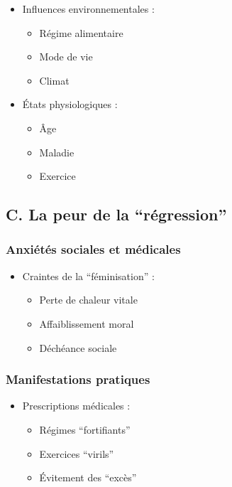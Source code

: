 \documentclass[
  letterpaper,
  DIV=11,
  numbers=noendperiod]{scrreprt}
\providecommand{\tightlist}{%
  \setlength{\itemsep}{0pt}\setlength{\parskip}{0pt}}\usepackage{longtable,booktabs,array}
\begin{document}
\begin{itemize}
\tightlist
\item
  Influences environnementales :

  \begin{itemize}
  \tightlist
  \item
    Régime alimentaire
  \item
    Mode de vie
  \item
    Climat
  \end{itemize}
\item
  États physiologiques :

  \begin{itemize}
  \tightlist
  \item
    Âge
  \item
    Maladie
  \item
    Exercice
  \end{itemize}
\end{itemize}

\subsection{C. La peur de la
``régression''}\label{c.-la-peur-de-la-ruxe9gression}

\subsubsection{Anxiétés sociales et
médicales}\label{anxiuxe9tuxe9s-sociales-et-muxe9dicales}

\begin{itemize}
\tightlist
\item
  Craintes de la ``féminisation'' :

  \begin{itemize}
  \tightlist
  \item
    Perte de chaleur vitale
  \item
    Affaiblissement moral
  \item
    Déchéance sociale
  \end{itemize}
\end{itemize}

\subsubsection{Manifestations pratiques}\label{manifestations-pratiques}

\begin{itemize}
\tightlist
\item
  Prescriptions médicales :

  \begin{itemize}
  \tightlist
  \item
    Régimes ``fortifiants''
  \item
    Exercices ``virils''
  \item
    Évitement des ``excès''
  \end{itemize}
\end{itemize}
\end{document}
